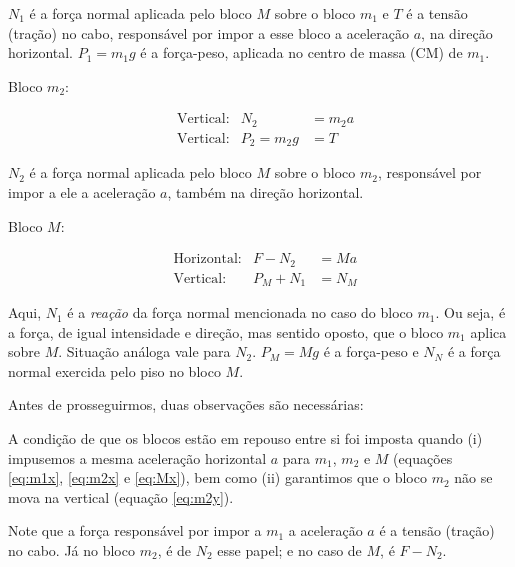 \begin{question}
\begin{solution}
\begin{enumerate}
\begin{minipage}[t]{0.3\textwidth}
				{\scriptsize $N_1$ é a força normal aplicada pelo bloco $M$ sobre o bloco $m_1$ e $T$ é a tensão (tração) no cabo, responsável por impor a esse bloco a aceleração $a$, na direção horizontal. $P_1 = m_1 g$ é a força-peso, aplicada no centro de massa (CM) de $m_1$.}
			\end{minipage}\hfill
			\begin{minipage}[t]{0.3\textwidth}
				\noindent
				Bloco $m_2$:


				\begin{align}
					&\text{Vertical:}& N_2 &= m_2 a \label{eq:m2x} \\
					&\text{Vertical:}& P_2 = m_2 g &= T \label{eq:m2y}
				\end{align}

				{\scriptsize $N_2$ é a força normal aplicada pelo bloco $M$ sobre o bloco $m_2$, responsável por impor a ele a aceleração $a$, também na direção horizontal.}
			\end{minipage}\hfill
			\begin{minipage}[t]{0.3\textwidth}
				\noindent
				Bloco $M$:


				\begin{align}
					&\text{Horizontal:}& F - N_2 &= Ma \label{eq:Mx} \\
					&\text{Vertical:}& P_M + N_1 &= N_M \label{eq:My}
				\end{align}

				{\scriptsize Aqui, $N_1$ é a \emph{reação} da força normal mencionada no caso do bloco $m_1$. Ou seja, é a força, de igual intensidade e direção, mas sentido oposto, que o bloco $m_1$ aplica sobre $M$. Situação análoga vale para $N_2$. $P_M = Mg$ é a força-peso e $N_N$ é a força normal exercida pelo piso no bloco $M$.}
			\end{minipage}

			\smallskip

			Antes de prosseguirmos, duas observações são necessárias:


\end{enumerate}
\end{solution}
\end{question}
